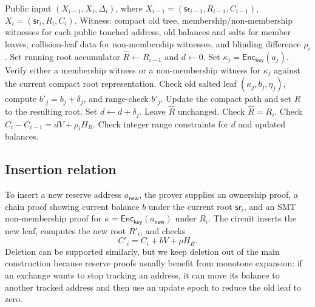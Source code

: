\documentclass[runningheads]{llncs}
\newcommand{\Enc}{\mathsf{Enc}}
\newcommand{\sr}{\mathsf{sr}}
\newcommand{\Rel}{\mathcal{R}}
\newcommand{\dlist}{\Delta}
\begin{document}
\begin{algorithm}[t]
\caption{SMT update relation \(\Rel_{\mathsf{upd}}^{\mathsf{smt}}\)}
\begin{algorithmic}[1]
\Require Public input \((X_{i-1},X_i,\dlist_i)\), where \(X_{i-1}=(\sr_{i-1},R_{i-1},C_{i-1})\), \(X_i=(\sr_i,R_i,C_i)\).
\Require Witness: compact old tree, membership/non-membership witnesses for each public touched address, old balances and salts for member leaves, collision-leaf data for non-membership witnesses, and blinding difference \(\rho_i\).
\State Set running root accumulator \(\widehat R\leftarrow R_{i-1}\) and \(d\leftarrow 0\).
    \State Set \(\kappa_j=\Enc_{\mathsf{key}}(a_j)\).
    \State Verify either a membership witness or a non-membership witness for \(\kappa_j\) against the current compact root representation.
        \State Check old salted leaf \((\kappa_j,b_j,\eta_j)\), compute \(b'_j=b_j+\delta_j\), and range-check \(b'_j\).
        \State Update the compact path and set \(\widehat R\) to the resulting root.
        \State Set \(d\leftarrow d+\delta_j\).
    \Else
        \State Leave \(\widehat R\) unchanged.
    \EndIf
\EndFor
\State Check \(\widehat R=R_i\).
\State Check \(C_i-C_{i-1}=dV+\rho_iH_B\).
\State Check integer range constraints for \(d\) and updated balances.
\end{algorithmic}
\end{algorithm}

\subsection{Insertion relation}

To insert a new reserve address \(a_{\mathsf{new}}\), the prover supplies an ownership proof, a chain proof showing current balance \(b\) under the current root \(\sr_i\), and an SMT non-membership proof for \(\kappa=\Enc_{\mathsf{key}}(a_{\mathsf{new}})\) under \(R_i\).  The circuit inserts the new leaf, computes the new root \(R'_i\), and checks
\[
        C'_i=C_i+bV+\rho H_B.
\]
Deletion can be supported similarly, but we keep deletion out of the main construction because reserve proofs usually benefit from monotone expansion: if an exchange wants to stop tracking an address, it can move its balance to another tracked address and then use an update epoch to reduce the old leaf to zero.
\end{document}
